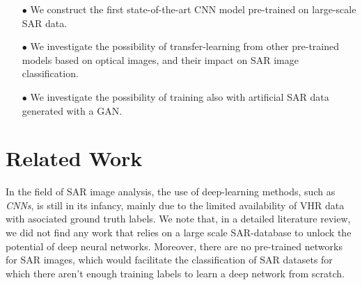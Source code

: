 \documentclass{article}
\begin{document}
\begin{itemize}

  \vspace{-0.33em}
  \item[$\bullet$] We construct the first state-of-the-art CNN model
    pre-trained on large-scale SAR data.

  \vspace{-0.33em}
  \item[$\bullet$] We investigate the possibility of transfer-learning
    from other pre-trained models based on optical images, and their
    impact on SAR image classification.

  \vspace{-0.33em}
  \item[$\bullet$] We investigate the possibility of training also
    with artificial SAR data generated with a GAN.

\end{itemize}


\section{Related Work}
\label{sec:previous work}

In the field of SAR image analysis, the use of deep-learning methods,
such as \emph{CNNs}, is still in its infancy, mainly due to the
limited availability of VHR data with asociated ground truth labels.
%
We note that, in a detailed literature review, we did not find any
work that relies on a large scale SAR-database to unlock the potential
of deep neural networks.
%
Moreover, there are no pre-trained networks for SAR images, which
would facilitate the classification of SAR datasets for which there
aren't enough training labels to learn a deep network from scratch.
\end{document}
